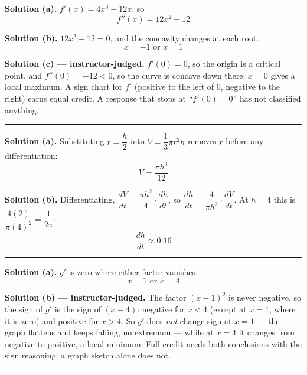 \documentclass[12pt]{article}
\begin{document}

\textbf{Solution (a).} $f'(x) = 4x^3 - 12x$, so
\[ \boxed{f''(x) = 12x^2 - 12} \]

\textbf{Solution (b).} $12x^2 - 12 = 0$, and the concavity changes at each root.
\[ \boxed{x = -1 \text{ or } x = 1} \]

\textbf{Solution (c) --- instructor-judged.} $f'(0) = 0$, so the origin is a
critical point, and $f''(0) = -12 < 0$, so the curve is concave down there:
$x = 0$ gives a local maximum. A sign chart for $f'$ (positive to the left of
$0$, negative to the right) earns equal credit. A response that stops at
``$f'(0) = 0$'' has not classified anything.

\vspace{0.15cm}\noindent\rule{\linewidth}{0.2pt}


\textbf{Solution (a).} Substituting $r = \dfrac{h}{2}$ into
$V = \dfrac{1}{3}\pi r^2 h$ removes $r$ before any differentiation:
\[ \boxed{V = \frac{\pi h^3}{12}} \]

\textbf{Solution (b).} Differentiating,
$\dfrac{dV}{dt} = \dfrac{\pi h^2}{4}\cdot\dfrac{dh}{dt}$, so
$\dfrac{dh}{dt} = \dfrac{4}{\pi h^2}\cdot\dfrac{dV}{dt}$. At $h = 4$ this is
$\dfrac{4(2)}{\pi(4)^2} = \dfrac{1}{2\pi}$.
\[ \boxed{\frac{dh}{dt} \approx 0.16} \]

\vspace{0.15cm}\noindent\rule{\linewidth}{0.2pt}


\textbf{Solution (a).} $g'$ is zero where either factor vanishes.
\[ \boxed{x = 1 \text{ or } x = 4} \]

\textbf{Solution (b) --- instructor-judged.} The factor $(x-1)^2$ is never
negative, so the sign of $g'$ is the sign of $(x - 4)$: negative for $x < 4$
(except at $x = 1$, where it is zero) and positive for $x > 4$. So $g'$ does
\emph{not} change sign at $x = 1$ --- the graph flattens and keeps falling, no
extremum --- while at $x = 4$ it changes from negative to positive, a local
minimum. Full credit needs both conclusions with the sign reasoning; a graph
sketch alone does not.

\vspace{0.15cm}\noindent\rule{\linewidth}{0.2pt}
\end{document}
